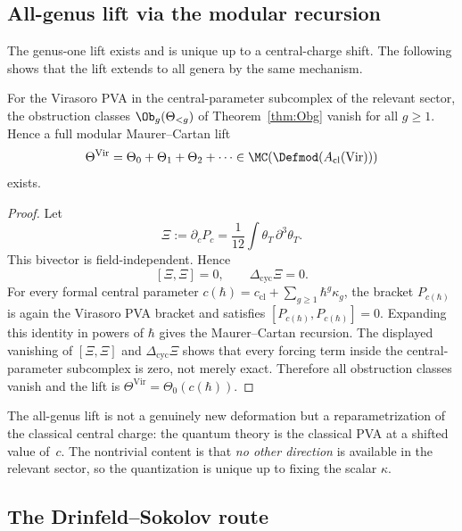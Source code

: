 \subsection{All-genus lift via the modular recursion}
\label{subsec:virasoro-all-genus-lift}

The genus-one lift exists and is unique up to a central-charge shift.
The following shows that the lift extends to all genera by the same mechanism.

\begin{proposition}
\label{prop:virasoro-higher-genus}
For the Virasoro PVA in the central-parameter subcomplex of the
relevant sector, the obstruction classes $\Ob_g(\Theta_{<g})$ of
Theorem~\textup{\ref{thm:Obg}} vanish for all $g\ge 1$. Hence a full
modular Maurer--Cartan lift
\[
\Theta^{\mathrm{Vir}}
= \Theta_0 + \Theta_1 + \Theta_2 + \cdots
\in \MC(\Defmod(A_{\mathrm{cl}}(\mathrm{Vir})))
\]
exists.
\end{proposition}

\begin{proof}
Let
\[
 \Xi:=\partial_c P_c=\frac{1}{12}\int \theta_T\,\partial^3\theta_T.
\]
This bivector is field-independent. Hence
\[
 [\Xi,\Xi]=0,\qquad
 \Delta_{\mathrm{cyc}}\Xi=0.
\]
For every formal central parameter
$c(\hbar)=c_{\mathrm{cl}}+\sum_{g\geq1}\hbar^g\kappa_g$, the bracket
$P_{c(\hbar)}$ is again the Virasoro PVA bracket and satisfies
$[P_{c(\hbar)},P_{c(\hbar)}]=0$. Expanding this identity in powers of
$\hbar$ gives the Maurer--Cartan recursion. The displayed vanishing of
$[\Xi,\Xi]$ and $\Delta_{\mathrm{cyc}}\Xi$ shows that every forcing term
inside the central-parameter subcomplex is zero, not merely exact.
Therefore all obstruction classes vanish and the lift is
$\Theta^{\mathrm{Vir}}=\Theta_0(c(\hbar))$.
\end{proof}

\begin{remark}
The all-genus lift is not a genuinely new deformation but a reparametrization
of the classical central charge: the quantum theory is the classical PVA
at a shifted value of~$c$. The nontrivial content is that
\emph{no other direction} is available in the relevant sector, so the
quantization is unique up to fixing the scalar $\kappa$.
\end{remark}

\subsection{The Drinfeld--Sokolov route}
\label{subsec:virasoro-ds-route}

